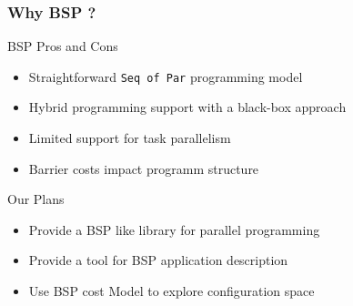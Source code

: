 \frame
{
  \frametitle{Why BSP ?}
  \begin{block}{BSP Pros and Cons}
  \begin{itemize}
  \footnotesize
  \item Straightforward \texttt{Seq of Par} programming model
  \item Hybrid programming support with a black-box approach
  \item Limited support for task parallelism
  \item Barrier costs impact programm structure
 \end{itemize}
  \end{block}{}

  \begin{block}{Our Plans}
  \begin{itemize}
  \footnotesize
  \item Provide a BSP like library for parallel programming
  \item Provide a tool for BSP application description
  \item Use BSP cost Model to explore configuration space
 \end{itemize}
  \end{block}{}
}

